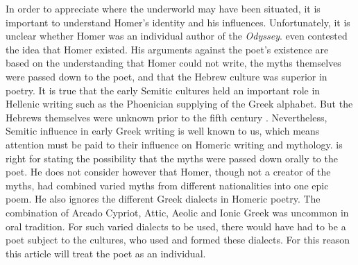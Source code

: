 In order to appreciate where the underworld may have been situated, it is important to understand Homer’s identity and his influences. Unfortunately, it is unclear whether Homer was an individual author of the \emph{Odyssey}. \textcite[xi–-xii]{Parry1987} even contested the idea that Homer existed. His arguments against the poet’s existence are based on the understanding that Homer could not write, the myths themselves were passed down to the poet, and that the Hebrew culture was superior in poetry. It is true that the early Semitic cultures held an important role in Hellenic writing such as the Phoenician supplying of the Greek alphabet. But the Hebrews themselves were unknown prior to the fifth century \BC. Nevertheless, Semitic influence in early Greek writing is well known to us, which means attention must be paid to their influence on Homeric writing and mythology. \textcite{Parry1987} is right for stating the possibility that the myths were passed down orally to the poet. He does not consider however that Homer, though not a creator of the myths, had combined varied myths from different nationalities into one epic poem. He also ignores the different Greek dialects in Homeric poetry. The combination of Arcado Cypriot, Attic, Aeolic and Ionic Greek was uncommon in oral tradition. For such varied dialects to be used, there would have had to be a poet subject to the cultures, who used and formed these dialects.  For this reason this article will treat the poet as an individual.
	

